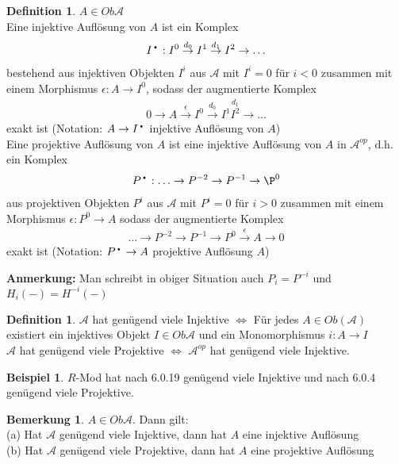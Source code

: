 \documentclass[10pt,a4paper,numbers=endperiod]{scrreprt}
\theoremstyle{definition}
\newtheorem{defi}[satz]{Definition}
\newtheorem{bem}[satz]{Bemerkung}
\newtheorem{bsp}[satz]{Beispiel}
\newcommand{\point}{\text{\textbullet}}
\begin{document}
\begin{defi}
	$A \in Ob \mathcal{A}$\\
	Eine injektive Auflösung von $A$ ist ein Komplex \begin{align*}
	I^\point: I^0 \overset{d_0}{\to} I^1 \overset{d_1}{\to} I^2 \to \ldots
	\end{align*}
	bestehend aus injektiven Objekten $I^i$ aus $\mathcal{A}$ mit $I^i = 0$ für $i <0$ zusammen mit einem Morphismus $\epsilon: A \to I^0$, sodass der augmentierte Komplex \begin{align*}
	0 \to A \overset{\epsilon}{\to} I^0 \overset{d_0}{\to} I^1 \overset{d_1}{I^2} \to \ldots
	\end{align*}
	exakt ist (Notation: $A \to I^\point$ injektive Auflösung von $A$)\\
	
	Eine projektive Auflösung von $A$ ist eine injektive Auflösung von $A$ in $\mathcal{A}^{op}$, d.h. ein Komplex \begin{align*}
	P^\point : \ldots \to P^{-2} \to P^{-1} \to \P^0
	\end{align*}
	aus projektiven Objekten $P^i$ aus $\mathcal{A}$ mit $P^i = 0$ für $i > 0$ zusammen mit einem Morphismus $\epsilon: P^0 \to A$ sodass der augmentierte Komplex \begin{align*}
		\ldots \to P^{-2} \to P^{-1} \to P^0 \overset{\epsilon}{\to} A \to 0
	\end{align*}
	exakt ist (Notation: $P^\point \to A$ projektive Auflösung $A$)
\end{defi}

\textbf{Anmerkung:} Man schreibt in obiger Situation auch $P_i = P^{-i}$ und $H_i(-) = H^{-i}(-)$

\begin{defi}
	$\mathcal{A}$ hat genügend viele Injektive $\Leftrightarrow$ Für jedes $A \in Ob(\mathcal{A})$ existiert ein injektives Objekt $I \in Ob \mathcal{A}$ und ein Monomorphismus $i: A \to I$\\
	$\mathcal{A}$ hat genügend viele Projektive $\Leftrightarrow$ $\mathcal{A}^{op}$ hat genügend viele Injektive.
\end{defi}

\begin{bsp}
	$R$-Mod hat nach 6.0.19 genügend viele Injektive und nach 6.0.4 genügend viele Projektive.
\end{bsp}

\begin{bem}
	$A \in Ob \mathcal{A}$. Dann gilt:\\
	(a) Hat $\mathcal{A}$ genügend viele Injektive, dann hat $A$ eine injektive Auflösung\\
	(b) Hat $\mathcal{A}$ genügend viele Projektive, dann hat $A$ eine projektive Auflösung
\end{bem}
\end{document}
